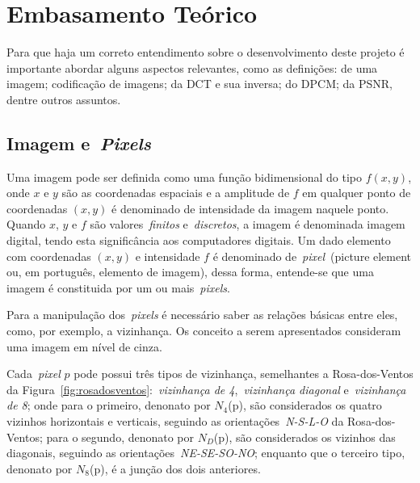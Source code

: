\documentclass[conference]{Trabalho_3}
\begin{document}

\section{Embasamento Te\'orico}
  \label{teorico}
Para que haja um correto entendimento sobre o desenvolvimento deste projeto \'e importante abordar alguns aspectos relevantes, como as defini\c{c}\~oes: de uma imagem; codifica\c{c}\~ao de imagens; da DCT e sua inversa; do DPCM; da PSNR, dentre outros assuntos.

\subsection{Imagem e~\textit{Pixels}}
  \label{imagens}
Uma imagem pode ser definida como uma fun\c{c}\~ao bidimensional do tipo $f(x,y)$, onde $x$ e $y$ s\~ao as coordenadas espaciais e a amplitude de $f$ em qualquer ponto de coordenadas $(x,y)$ \'e denominado de intensidade da imagem naquele ponto. Quando $x$, $y$ e $f$ s\~ao valores~\textit{finitos} e~\textit{discretos}, a imagem \'e denominada imagem digital, tendo esta signific\^ancia aos computadores digitais. Um dado elemento com coordenadas $(x,y)$ e intensidade $f$ \'e denominado de~\textit{pixel}~(picture element ou, em portugu\^es, elemento de imagem), dessa forma, entende-se que uma imagem \'e constituida por um ou mais~\textit{pixels}.

Para a manipula\c{c}\~ao dos~\textit{pixels} \'e necess\'ario saber as rela\c{c}\~oes b\'asicas entre eles, como, por exemplo, a vizinhan\c{c}a. Os conceito a serem apresentados consideram uma imagem em n\'ivel de cinza.

Cada~\textit{pixel} $p$ pode possui tr\^es tipos de vizinhan\c{c}a, semelhantes a Rosa-dos-Ventos da Figura~\ref{fig:rosadosventos}:~\textit{vizinhan\c{c}a de 4},~\textit{vizinhan\c{c}a diagonal} e~\textit{vizinhan\c{c}a de 8}; onde para o primeiro, denonato por $N_4$(p), s\~ao considerados os quatro vizinhos horizontais e verticais, seguindo as orienta\c{c}\~oes~\textit{N-S-L-O} da Rosa-dos-Ventos; para o segundo, denonato por $N_D$(p), s\~ao considerados os vizinhos das diagonais, seguindo as orienta\c{c}\~oes~\textit{NE-SE-SO-NO}; enquanto que o terceiro tipo, denonato por $N_8$(p), \'e a jun\c{c}\~ao dos dois anteriores.
\end{document}
